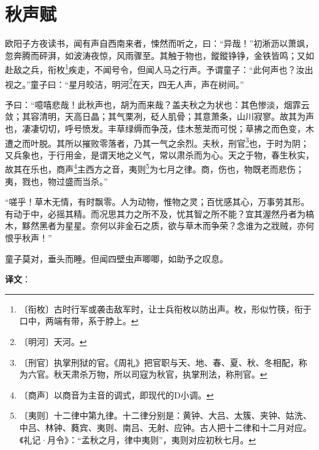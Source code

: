 \documentclass[12pt,UTF-8,openany]{ctexbook}
\begin{document}
\chapter{秋声赋}

\begin{normalsize}
    
    欧阳子方夜读书，闻有声自西南来者，悚然而听之，曰：“异哉！”初淅沥以萧飒，忽奔腾而砰湃，如波涛夜惊，风雨骤至。其触于物也，鏦鏦铮铮，金铁皆鸣；又如赴敌之兵，衔枚\footnote{〔衔枚〕古时行军或袭击敌军时，让士兵衔枚以防出声。枚，形似竹筷，衔于口中，两端有带，系于脖上。}疾走，不闻号令，但闻人马之行声。予谓童子：“此何声也？汝出视之。”童子曰：“星月皎洁，明河\footnote{〔明河〕天河。}在天，四无人声，声在树间。”
    
    予曰：“噫嘻悲哉！此秋声也，胡为而来哉？盖夫秋之为状也：其色惨淡，烟霏云敛；其容清明，天高日晶；其气栗冽，砭人肌骨；其意萧条，山川寂寥。故其为声也，凄凄切切，呼号愤发。丰草绿缛而争茂，佳木葱茏而可悦；草拂之而色变，木遭之而叶脱。其所以摧败零落者，乃其一气之余烈。夫秋，刑官\footnote{〔刑官〕执掌刑狱的官。《周礼》把官职与天、地、春、夏、秋、冬相配，称为六官。秋天肃杀万物，所以司寇为秋官，执掌刑法，称刑官。}也，于时为阴；又兵象也，于行用金，是谓天地之义气，常以肃杀而为心。天之于物，春生秋实，故其在乐也，商声\footnote{〔商声〕以商音为主音的调式，即现代的D小调。}主西方之音，夷则\footnote{〔夷则〕十二律中第九律。十二律分别是：黄钟、大吕、太簇、夹钟、姑洗、中吕、林钟、蕤宾、夷则、南吕、无射、应钟。古人把十二律和十二月对应。《礼记·月令》：“孟秋之月，律中夷则”，夷则对应初秋七月。}为七月之律。商，伤也，物既老而悲伤；夷，戮也，物过盛而当杀。”
    
    “嗟乎！草木无情，有时飘零。人为动物，惟物之灵；百忧感其心，万事劳其形。有动于中，必摇其精。而况思其力之所不及，忧其智之所不能？宜其渥然丹者为槁木，黟然黑者为星星。奈何以非金石之质，欲与草木而争荣？念谁为之戕贼，亦何恨乎秋声！”
    
    童子莫对，垂头而睡。但闻四壁虫声唧唧，如助予之叹息。
\end{normalsize}


\newpage

\textbf{译文}：

\vspace{1em}
\end{document}
